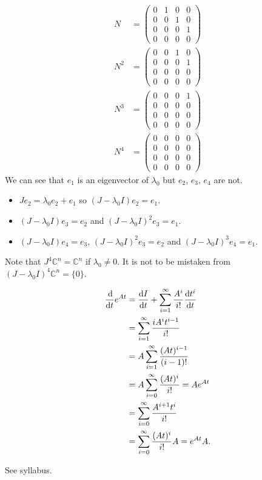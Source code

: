 \begin{solution}
  \begin{align*}
    N & =
    \begin{pmatrix}
      0 & 1 & 0 & 0\\
      0 & 0 & 1 & 0\\
      0 & 0 & 0 & 1\\
      0 & 0 & 0 & 0
    \end{pmatrix}\\
    N^2 & =
    \begin{pmatrix}
      0 & 0 & 1 & 0\\
      0 & 0 & 0 & 1\\
      0 & 0 & 0 & 0\\
      0 & 0 & 0 & 0
    \end{pmatrix}\\
    N^3 & =
    \begin{pmatrix}
      0 & 0 & 0 & 1\\
      0 & 0 & 0 & 0\\
      0 & 0 & 0 & 0\\
      0 & 0 & 0 & 0
    \end{pmatrix}\\
    N^4 & =
    \begin{pmatrix}
      0 & 0 & 0 & 0\\
      0 & 0 & 0 & 0\\
      0 & 0 & 0 & 0\\
      0 & 0 & 0 & 0
    \end{pmatrix}
  \end{align*}
  We can see that $e_1$ is an eigenvector of $\lambda_0$ but
  $e_2$, $e_3$, $e_4$ are not.
  \begin{itemize}
    \item $Je_2 = \lambda_0 e_2 + e_1$
      so $(J - \lambda_0 I)e_2 = e_1$.
    \item $(J - \lambda_0 I)e_3 = e_2$ and $(J - \lambda_0 I)^2e_3 = e_1$.
    \item $(J - \lambda_0 I)e_4 = e_3$, $(J - \lambda_0 I)^2e_3 = e_2$
      and $(J - \lambda_0 I)^3e_4 = e_1$.
  \end{itemize}

  Note that $J^4 \mathbb{C}^n = \mathbb{C}^n$ if $\lambda_0 \neq 0$.
  It is not to be mistaken from $(J - \lambda_0 I)^4 \mathbb{C}^n = \{0\}$.
\end{solution}

\begin{solution}
  \begin{align*}
    \frac{\operatorname{d}\! }{\operatorname{d}\! t}e^{At}
    & = \frac{\operatorname{d}\! I}{\operatorname{d}\! t} + \sum_{i=1}^\infty \frac{A^i}{i!} \frac{\operatorname{d}\! t^i}{\operatorname{d}\! t}\\
    & = \sum_{i=1}^\infty \frac{iA^it^{i-1}}{i!}\\
    & = A\sum_{i=1}^\infty \frac{(At)^{i-1}}{(i-1)!}\\
    & = A \sum_{i=0}^\infty \frac{(At)^i}{i!} = A e^{At}\\
    & = \sum_{i=0}^\infty \frac{A^{i+1} t^i}{i!}\\
    & = \sum_{i=0}^\infty \frac{(At)^i}{i!} A = e^{At} A.
  \end{align*}
\end{solution}

\begin{solution}
  See syllabus.
\end{solution}
